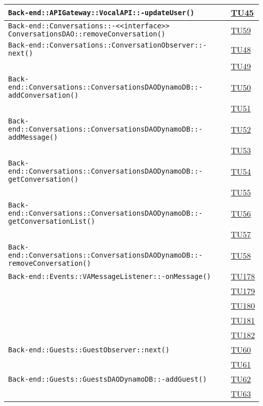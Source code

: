 \begin{longtable}{|>{\centering}m{12cm}|m{1cm}<{\centering}|}
\texttt{Back-end::APIGateway::VocalAPI::-\linebreak updateUser()} & \hyperlink{TU45}{TU45}\\ \hline
\texttt{Back-end::Conversations::-\linebreak <<interface>> ConversationsDAO::removeConversation()} & \hyperlink{TU59}{TU59}\\ \hline
\texttt{Back-end::Conversations::ConversationObserver::-\linebreak next()} & \hyperlink{TU48}{TU48}\\ & \hyperlink{TU49}{TU49}\\ \hline
\texttt{Back-end::Conversations::ConversationsDAODynamoDB::-\linebreak addConversation()} & \hyperlink{TU50}{TU50}\\ & \hyperlink{TU51}{TU51}\\ \hline
\texttt{Back-end::Conversations::ConversationsDAODynamoDB::-\linebreak addMessage()} & \hyperlink{TU52}{TU52}\\ & \hyperlink{TU53}{TU53}\\ \hline
\texttt{Back-end::Conversations::ConversationsDAODynamoDB::-\linebreak getConversation()} & \hyperlink{TU54}{TU54}\\ & \hyperlink{TU55}{TU55}\\ \hline
\texttt{Back-end::Conversations::ConversationsDAODynamoDB::-\linebreak getConversationList()} & \hyperlink{TU56}{TU56}\\ & \hyperlink{TU57}{TU57}\\ \hline
\texttt{Back-end::Conversations::ConversationsDAODynamoDB::-\linebreak removeConversation()} & \hyperlink{TU58}{TU58}\\ \hline
\texttt{Back-end::Events::VAMessageListener::-\linebreak onMessage()} & \hyperlink{TU178}{TU178}\\ & \hyperlink{TU179}{TU179}\\ & \hyperlink{TU180}{TU180}\\ & \hyperlink{TU181}{TU181}\\ & \hyperlink{TU182}{TU182}\\ \hline
\texttt{Back-end::Guests::GuestObserver::next()} & \hyperlink{TU60}{TU60}\\ & \hyperlink{TU61}{TU61}\\ \hline
\texttt{Back-end::Guests::GuestsDAODynamoDB::-\linebreak addGuest()} & \hyperlink{TU62}{TU62}\\ & \hyperlink{TU63}{TU63}\\ \hline

\end{longtable}
